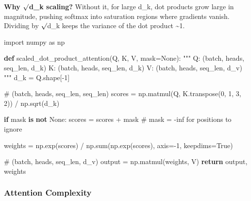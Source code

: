 \documentclass[11pt]{article}
\newenvironment{Shaded}{\begin{snugshade}}{\end{snugshade}}
\newcommand{\BuiltInTok}[1]{\textcolor[rgb]{0.50,0.55,0.55}{#1}}
\newcommand{\CommentTok}[1]{\textcolor[rgb]{0.48,0.49,0.49}{#1}}
\newcommand{\ControlFlowTok}[1]{\textcolor[rgb]{0.99,0.74,0.29}{\textbf{#1}}}
\newcommand{\DecValTok}[1]{\textcolor[rgb]{0.96,0.45,0.00}{#1}}
\newcommand{\ImportTok}[1]{\textcolor[rgb]{0.15,0.68,0.38}{#1}}
\newcommand{\KeywordTok}[1]{\textcolor[rgb]{0.81,0.81,0.76}{\textbf{#1}}}
\newcommand{\NormalTok}[1]{\textcolor[rgb]{0.81,0.81,0.76}{#1}}
\newcommand{\OperatorTok}[1]{\textcolor[rgb]{0.81,0.81,0.76}{#1}}
\newcommand{\VariableTok}[1]{\textcolor[rgb]{0.15,0.68,0.68}{#1}}
\begin{document}
\textbf{Why \(\surd\)d\_k scaling?} Without it, for large d\_k, dot products grow large in magnitude, pushing softmax into saturation regions where gradients vanish. Dividing by \(\surd\)d\_k keeps the variance of the dot product \textasciitilde1.


\begin{Shaded}
\begin{Highlighting}[]
\ImportTok{import}\NormalTok{ numpy }\ImportTok{as}\NormalTok{ np}

\KeywordTok{def}\NormalTok{ scaled\_dot\_product\_attention(Q, K, V, mask}\OperatorTok{=}\VariableTok{None}\NormalTok{):}
    \CommentTok{"""}
\CommentTok{    Q: (batch, heads, seq\_len, d\_k)}
\CommentTok{    K: (batch, heads, seq\_len, d\_k)}
\CommentTok{    V: (batch, heads, seq\_len, d\_v)}
\CommentTok{    """}
\NormalTok{    d\_k }\OperatorTok{=}\NormalTok{ Q.shape[}\OperatorTok{{-}}\DecValTok{1}\NormalTok{]}
    
    \CommentTok{\# (batch, heads, seq\_len, seq\_len)}
\NormalTok{    scores }\OperatorTok{=}\NormalTok{ np.matmul(Q, K.transpose(}\DecValTok{0}\NormalTok{, }\DecValTok{1}\NormalTok{, }\DecValTok{3}\NormalTok{, }\DecValTok{2}\NormalTok{)) }\OperatorTok{/}\NormalTok{ np.sqrt(d\_k)}
    
    \ControlFlowTok{if}\NormalTok{ mask }\KeywordTok{is} \KeywordTok{not} \VariableTok{None}\NormalTok{:}
\NormalTok{        scores }\OperatorTok{=}\NormalTok{ scores }\OperatorTok{+}\NormalTok{ mask  }\CommentTok{\# mask = {-}inf for positions to ignore}
    
\NormalTok{    weights }\OperatorTok{=}\NormalTok{ np.exp(scores) }\OperatorTok{/}\NormalTok{ np.}\BuiltInTok{sum}\NormalTok{(np.exp(scores), axis}\OperatorTok{={-}}\DecValTok{1}\NormalTok{, keepdims}\OperatorTok{=}\VariableTok{True}\NormalTok{)}
    
    \CommentTok{\# (batch, heads, seq\_len, d\_v)}
\NormalTok{    output }\OperatorTok{=}\NormalTok{ np.matmul(weights, V)}
    \ControlFlowTok{return}\NormalTok{ output, weights}
\end{Highlighting}
\end{Shaded}

\subsubsection{Attention Complexity}\label{attention-complexity}
\end{document}
